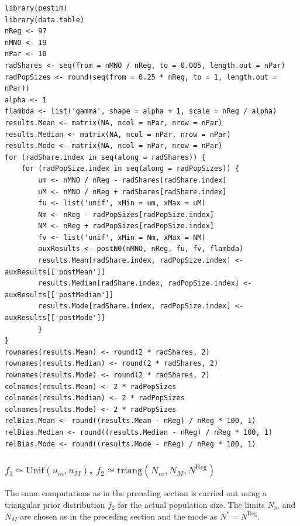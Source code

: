 \documentclass[12pt, a4paper]{article}
\begin{document}
\begin{verbatim}
library(pestim)
library(data.table)
nReg <- 97
nMNO <- 19
nPar <- 10
radShares <- seq(from = nMNO / nReg, to = 0.005, length.out = nPar)
radPopSizes <- round(seq(from = 0.25 * nReg, to = 1, length.out = nPar))
alpha <- 1
flambda <- list('gamma', shape = alpha + 1, scale = nReg / alpha)
results.Mean <- matrix(NA, ncol = nPar, nrow = nPar)
results.Median <- matrix(NA, ncol = nPar, nrow = nPar)
results.Mode <- matrix(NA, ncol = nPar, nrow = nPar)
for (radShare.index in seq(along = radShares)) {
    for (radPopSize.index in seq(along = radPopSizes)) {
        um <- nMNO / nReg - radShares[radShare.index]
        uM <- nMNO / nReg + radShares[radShare.index]
        fu <- list('unif', xMin = um, xMax = uM)
        Nm <- nReg - radPopSizes[radPopSize.index]
        NM <- nReg + radPopSizes[radPopSize.index]
        fv <- list('unif', xMin = Nm, xMax = NM)
        auxResults <- postN0(nMNO, nReg, fu, fv, flambda)
        results.Mean[radShare.index, radPopSize.index] <- auxResults[['postMean']] 
        results.Median[radShare.index, radPopSize.index] <- auxResults[['postMedian']]
        results.Mode[radShare.index, radPopSize.index] <- auxResults[['postMode']]
        }
}
rownames(results.Mean) <- round(2 * radShares, 2)
rownames(results.Median) <- round(2 * radShares, 2)
rownames(results.Mode) <- round(2 * radShares, 2)
colnames(results.Mean) <- 2 * radPopSizes
colnames(results.Median) <- 2 * radPopSizes
colnames(results.Mode) <- 2 * radPopSizes
relBias.Mean <- round((results.Mean - nReg) / nReg * 100, 1)
relBias.Median <- round((results.Median - nReg) / nReg * 100, 1)
relBias.Mode <- round((results.Mode - nReg) / nReg * 100, 1)
\end{verbatim}

\subsubsection{$f_{1}\simeq\textrm{Unif}(u_{m}, u_{M})$, $f_{2}\simeq\textrm{triang}(N_{m}, N_{M}, N^{\textrm{Reg}})$}

The same computations as in the preceding section is carried out using a triangular prior distribution $f_{2}$ for the actual
population size. The limits $N_{m}$ and $N_{M}$ are chosen as in the preceding section and the mode as $N^{*}=N^{\textrm{Reg}}$.
\end{document}

